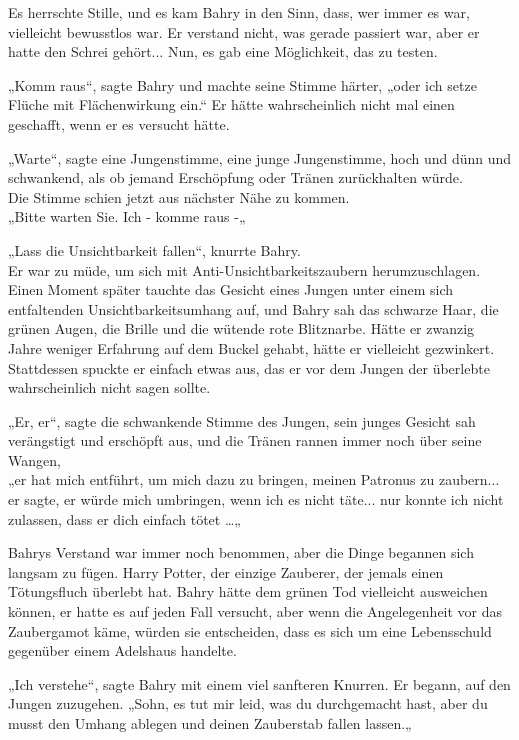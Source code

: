 {Es herrschte Stille, und es kam Bahry in den Sinn, dass, wer immer es war, vielleicht bewusstlos war. Er verstand nicht, was gerade passiert war, aber er hatte den Schrei gehört... Nun, es gab eine Möglichkeit, das zu testen.

„Komm raus“, sagte Bahry und machte seine Stimme härter, „oder ich setze Flüche mit Flächenwirkung ein.“ Er hätte wahrscheinlich nicht mal einen geschafft, wenn er es versucht hätte.

„Warte“, sagte eine Jungenstimme, eine junge Jungenstimme, hoch und dünn und schwankend, als ob jemand Erschöpfung oder Tränen zurückhalten würde.\\ Die Stimme schien jetzt aus nächster Nähe zu kommen.\\ „Bitte warten Sie. Ich - komme raus -„

„Lass die Unsichtbarkeit fallen“, knurrte Bahry.\\ Er war zu müde, um sich mit Anti-Unsichtbarkeitszaubern herumzuschlagen. Einen Moment später tauchte das Gesicht eines Jungen unter einem sich entfaltenden Unsichtbarkeitsumhang auf, und Bahry sah das schwarze Haar, die grünen Augen, die Brille und die wütende rote Blitznarbe. Hätte er zwanzig Jahre weniger Erfahrung auf dem Buckel gehabt, hätte er vielleicht gezwinkert. Stattdessen spuckte er einfach etwas aus, das er vor dem Jungen der überlebte wahrscheinlich nicht sagen sollte.

„Er, er“, sagte die schwankende Stimme des Jungen, sein junges Gesicht sah verängstigt und erschöpft aus, und die Tränen rannen immer noch über seine Wangen,\\ „er hat mich entführt, um mich dazu zu bringen, meinen Patronus zu zaubern... er sagte, er würde mich umbringen, wenn ich es nicht täte... nur konnte ich nicht zulassen, dass er dich einfach tötet …„

Bahrys Verstand war immer noch benommen, aber die Dinge begannen sich langsam zu fügen. Harry Potter, der einzige Zauberer, der jemals einen Tötungsfluch überlebt hat. Bahry hätte dem grünen Tod vielleicht ausweichen können, er hatte es auf jeden Fall versucht, aber wenn die Angelegenheit vor das Zaubergamot käme, würden sie entscheiden, dass es sich um eine Lebensschuld gegenüber einem Adelshaus handelte.

„Ich verstehe“, sagte Bahry mit einem viel sanfteren Knurren. Er begann, auf den Jungen zuzugehen. „Sohn, es tut mir leid, was du durchgemacht hast, aber du musst den Umhang ablegen und deinen Zauberstab fallen lassen.„

}
